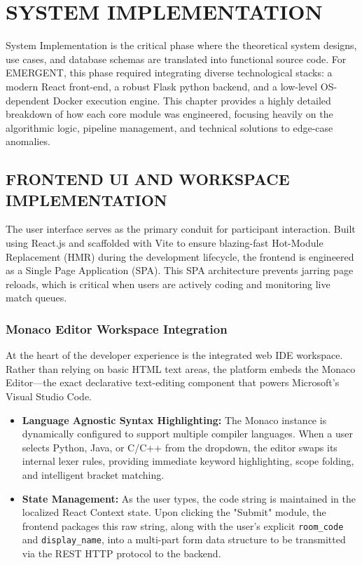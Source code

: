 \documentclass[12pt,a4paper]{report}
\begin{document}
\chapter{SYSTEM IMPLEMENTATION}

System Implementation is the critical phase where the theoretical system designs, use cases, and database schemas are translated into functional source code. For EMERGENT, this phase required integrating diverse technological stacks: a modern React front-end, a robust Flask python backend, and a low-level OS-dependent Docker execution engine. This chapter provides a highly detailed breakdown of how each core module was engineered, focusing heavily on the algorithmic logic, pipeline management, and technical solutions to edge-case anomalies.

\section{FRONTEND UI AND WORKSPACE IMPLEMENTATION}
The user interface serves as the primary conduit for participant interaction. Built using React.js and scaffolded with Vite to ensure blazing-fast Hot-Module Replacement (HMR) during the development lifecycle, the frontend is engineered as a Single Page Application (SPA). This SPA architecture prevents jarring page reloads, which is critical when users are actively coding and monitoring live match queues.

\subsection{Monaco Editor Workspace Integration}
At the heart of the developer experience is the integrated web IDE workspace. Rather than relying on basic HTML text areas, the platform embeds the Monaco Editor—the exact declarative text-editing component that powers Microsoft's Visual Studio Code.
\begin{itemize}
    \item \textbf{Language Agnostic Syntax Highlighting:} The Monaco instance is dynamically configured to support multiple compiler languages. When a user selects Python, Java, or C/C++ from the dropdown, the editor swaps its internal lexer rules, providing immediate keyword highlighting, scope folding, and intelligent bracket matching.
    \item \textbf{State Management:} As the user types, the code string is maintained in the localized React Context state. Upon clicking the "Submit" module, the frontend packages this raw string, along with the user's explicit \texttt{room\_code} and \texttt{display\_name}, into a multi-part form data structure to be transmitted via the REST HTTP protocol to the backend.
\end{itemize}
\end{document}
